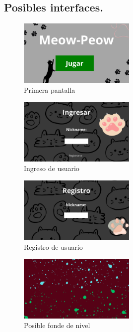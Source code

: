\subsection{Posibles interfaces.}
\begin{figure}[H]
    \centering
   \includegraphics[width=0.5\textwidth]{recursos/Imagenes/Inicio.png} 
    \caption{Primera pantalla}
    \label{fig:mi_imagen}
\end{figure}
\begin{figure}[H]
    \centering
   \includegraphics[width=0.5\textwidth]{recursos/Imagenes/Ingreso.png} 
    \caption{Ingreso de usuario}
    \label{fig:mi_imagen}
\end{figure}
\begin{figure}[H]
    \centering
   \includegraphics[width=0.5\textwidth]{recursos/Imagenes/Registro.png} 
    \caption{Registro de usuario}
    \label{fig:mi_imagen}
\end{figure}
\begin{figure}[H]
    \centering
   \includegraphics[width=0.5\textwidth]{recursos/Imagenes/Nivel.png} 
    \caption{Posible fonde de nivel}
    \label{fig:mi_imagen}
\end{figure}
